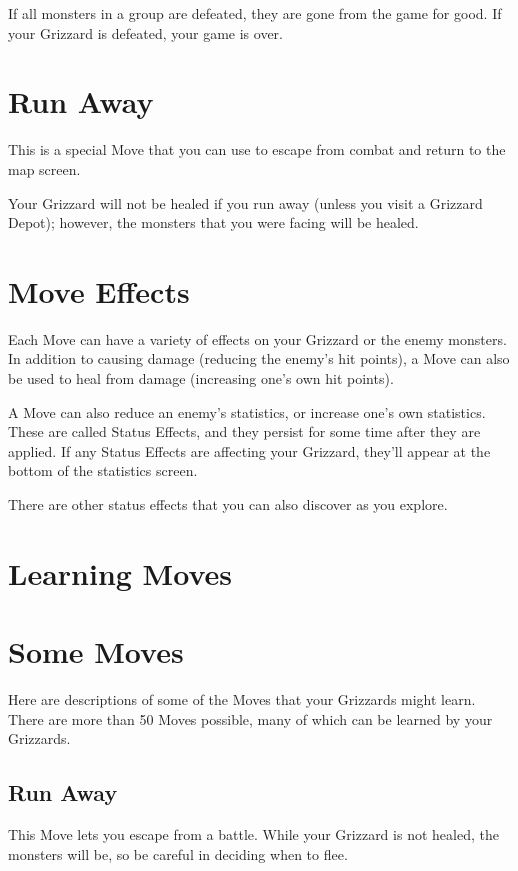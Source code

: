 \documentclass[12pt,twoside,openright,book]{memoir}
\begin{document}
\begin{description}
If all  monsters in a  group are defeated, they  are gone from  the game
for good. If your Grizzard is defeated, your game is over.

\section{Run Away}

This is a special Move that you can use to escape from combat and return
to the map screen.

Your  Grizzard will  not be  healed if  you run  away (unless  you visit
a  Grizzard Depot);  however, the  monsters  that you  were facing  will
be healed.

\section{Move Effects}

Each  Move  can have  a  variety  of effects  on  your  Grizzard or  the
enemy monsters. In addition to  causing damage (reducing the enemy's hit
points), a Move  can also be used to heal  from damage (increasing one's
own hit points).

A Move  can also  reduce an  enemy's statistics,  or increase  one's own
statistics. These are  called Status Effects, and they  persist for some
time after  they are applied. If  any Status Effects are  affecting your
Grizzard, they'll appear at the bottom of the statistics screen.

There  are  other   status  effects  that  you  can   also  discover  as
you explore.

\section{Learning Moves}

\section{Some Moves}

Here  are  descriptions  of  some  of  the  Moves  that  your  Grizzards
might learn. There are more than 50 Moves possible, many of which can be
learned by your Grizzards.

\subsection{Run Away}

This Move  lets you  escape from  a battle. While  your Grizzard  is not
healed, the monsters will be, so be careful in deciding when to flee.


\end{description}
\end{document}
